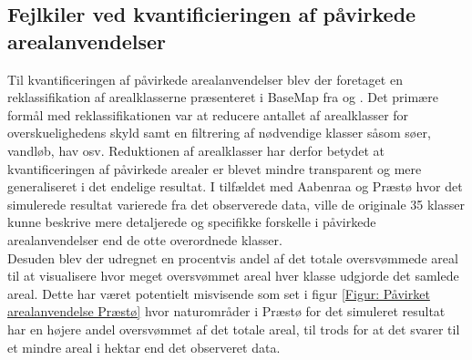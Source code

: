 \subsection{Fejlkiler ved kvantificieringen af påvirkede arealanvendelser}
Til kvantificeringen af påvirkede arealanvendelser blev der foretaget en reklassifikation af arealklasserne præsenteret i BaseMap fra \cite{Jepsen_levin_2013} og \cite{levin_basemap04_2022}. Det primære formål med reklassifikationen var at reducere antallet af arealklasser for overskuelighedens skyld samt en filtrering af nødvendige klasser såsom søer, vandløb, hav osv. Reduktionen af arealklasser har derfor betydet at kvantificeringen af påvirkede arealer er blevet mindre transparent og mere generaliseret i det endelige resultat. I tilfældet med Aabenraa og Præstø hvor det simulerede resultat varierede fra det observerede data, ville de originale 35 klasser kunne beskrive mere detaljerede og specifikke forskelle i påvirkede arealanvendelser end de otte overordnede klasser.\\
Desuden blev der udregnet en procentvis andel af det totale oversvømmede areal til at visualisere hvor meget oversvømmet areal hver klasse udgjorde det samlede areal. Dette har været potentielt misvisende som set i figur \ref{Figur: Påvirket arealanvendelse Præstø} hvor naturområder i Præstø for det simuleret resultat har en højere andel oversvømmet af det totale areal, til trods for at det svarer til et mindre areal i hektar end det observeret data.\\ 

